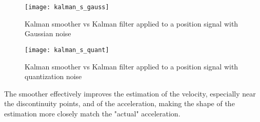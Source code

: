 \begin{figure}[H]
\centering
\texttt{[image: kalman\_s\_gauss]}
\caption{Kalman smoother vs Kalman filter applied to a position signal with Gaussian noise}
\label{fig:kalman_s_gauss}
\end{figure}

\begin{figure}[H]
\centering
\texttt{[image: kalman\_s\_quant]}
\caption{Kalman smoother vs Kalman filter applied to a position signal with quantization noise}
\label{fig:kalman_s_quant}
\end{figure}

The smoother effectively improves the estimation of the velocity, especially near the discontinuity points, and of the acceleration, making the shape of the estimation more closely match the "actual" acceleration.